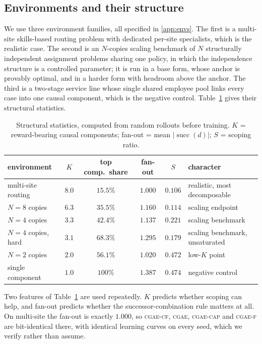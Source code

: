 \documentclass[review,authoryear,3p,times]{elsarticle}
\newcommand{\cgae}{\textsc{cgae}}              %
\newcommand{\cflow}{\textsc{cgae-cf}}          %
\newcommand{\cflowraw}{\textsc{cgae-f}}        %
\newcommand{\ccap}{\textsc{cgae-cap}}          %
\newcommand{\suc}{\operatorname{succ}}
\begin{document}
\subsection{Environments and their structure}

We use three environment families, all specified in \ref{app:envs}. The first
is a multi-site skills-based routing problem with dedicated per-site
specialists, which is the realistic case. The second is an $N$-copies scaling
benchmark of $N$ structurally independent assignment problems sharing one
policy, in which the independence structure is a controlled parameter; it is
run in a base form, whose anchor is provably optimal, and in a harder form
with headroom above the anchor. The third is a two-stage service line whose
single shared employee pool links every case into one causal component, which
is the negative control. Table~\ref{tab:envs} gives their structural
statistics.

\begin{table}[tbp]
\centering
\caption{Structural statistics, computed from random rollouts before training.
$K$ = reward-bearing causal components; fan-out = mean $|\suc(d)|$;
$S$ = scoping ratio.}
\label{tab:envs}
\begin{tabular}{lccccl}
\toprule
environment & $K$ & top comp.\ share & fan-out & $S$ & character \\
\midrule
multi-site routing & $8.0$ & $15.5\%$ & $\mathbf{1.000}$ & $0.106$ & realistic, most decomposable \\
$N=8$ copies       & $6.3$ & $35.5\%$ & $1.160$ & $0.114$ & scaling endpoint \\
$N=4$ copies       & $3.3$ & $42.4\%$ & $1.137$ & $0.221$ & scaling benchmark \\
$N=4$ copies, hard & $3.1$ & $68.3\%$ & $1.295$ & $0.179$ & scaling benchmark, unsaturated \\
$N=2$ copies       & $2.0$ & $56.1\%$ & $1.020$ & $0.472$ & low-$K$ point \\
single component   & $1.0$ & $100\%$  & $1.387$ & $0.474$ & negative control \\
\bottomrule
\end{tabular}
\end{table}

Two features of Table~\ref{tab:envs} are used repeatedly. $K$ predicts whether
scoping can help, and fan-out predicts whether the successor-combination rule
matters at all. On multi-site the fan-out is exactly $1.000$, so \cflow,
\cgae, \ccap{} and \cflowraw{} are bit-identical there, with identical
learning curves on every seed, which we verify rather than assume.
\end{document}
